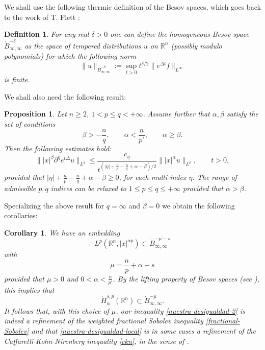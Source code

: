 \documentclass[12pt]{amsart}
\newcommand {\R}{\mathbb{R}}
\newtheorem{definition}[theorem]{Definition}
\newtheorem{corollary}[theorem]{Corollary}
\newtheorem{proposition}[theorem]{Proposition}
\begin{document}
We shall use the following thermic definition of the 
Besov spaces, which goes back to the work of T. Flett \cite{Flett}:

\begin{definition} 
\label{thermal-def}
For any real $\delta>0$ one can define the homogeneous Besov space 
$\dot B_{\infty,\infty}^{-\delta}$ as the space of tempered distributions $u$  on $\R^n$ (possibly modulo polynomials) for which the following norm 
$$
	\|u\|_{\dot B_{\infty,\infty}^{-\delta}} :=\sup_{t>0} t^{\delta/2} \|  e^{\Delta t} f \|_{L^\infty}
$$
is finite.
\end{definition}


 We shall also need the following result:

\begin{proposition}\cite[Proposition 3.2]{Luca} \label{heat-decay}
Let $n\geq 2$, $1 < p \leq q < +\infty$. Assume further that $\alpha, \beta$ satisfy the set of conditions 
 \begin{equation}
    \beta > -\frac nq,\qquad \alpha<\frac{n}{p'}, \qquad
    \alpha \geq \beta.
  \end{equation}
Then the following estimates hold:
\begin{equation}\label{PHeatDer}
     \||x|^{\beta} \partial^{\eta} e^{t\Delta}u \|_{L^{q}} 
     \leq \frac{c_{\eta}}{t^{(|\eta| + \frac{n}{p}-\frac{n}{q} + \alpha-\beta)/2}} 
     \| |x|^{\alpha} u \|_{L^{p}}, \qquad t>0,
     \end{equation}
provided that $|\eta| + \frac{n}{p}-\frac{n}{q} + \alpha-\beta \geq0$,
for each multi-index $\eta$. The range of admissible $p,q$ indices can be relaxed to $1\leq p \leq q \leq +\infty$ provided that $\alpha > \beta $. 
\end{proposition}

Specializing the above result for $q=\infty$ and $\beta=0$ we obtain the following corollaries:


\begin{corollary}
\label{remark-embedding-Besov}
We have an embedding
$$ L^p(\R^n,|x|^{\alpha p}) \subset \dot{B}^{-\mu-s}_{\infty,\infty}$$
with
$$ \mu= \frac{n}{p}+ \alpha-s $$
provided that $\mu>0$ and $0<\alpha<\frac{n}{p'}$. By the lifting property of Besov spaces (see \cite[Section 5.2.3, Theorem 1]{Triebel}), this implies that
$$ 
\dot{H}^{s,p}_\alpha(\R^n) \subset \dot{B}^{-\mu}_{\infty,\infty}.
$$
It follows that, with this choice of $\mu$, 
our inequality \eqref{nuestra-desigualdad-2} is indeed a refinement of the
weighted fractional Sobolev inequality \eqref{fractional-Sobolev}
  and that   
\eqref{nuestra-desigualdad-local} is in some cases a refinement 
of the  Caffarelli-Kohn-Nirenberg inequality \eqref{ckn},  in the sense of \cite{PP}.
\end{corollary}
\end{document}

